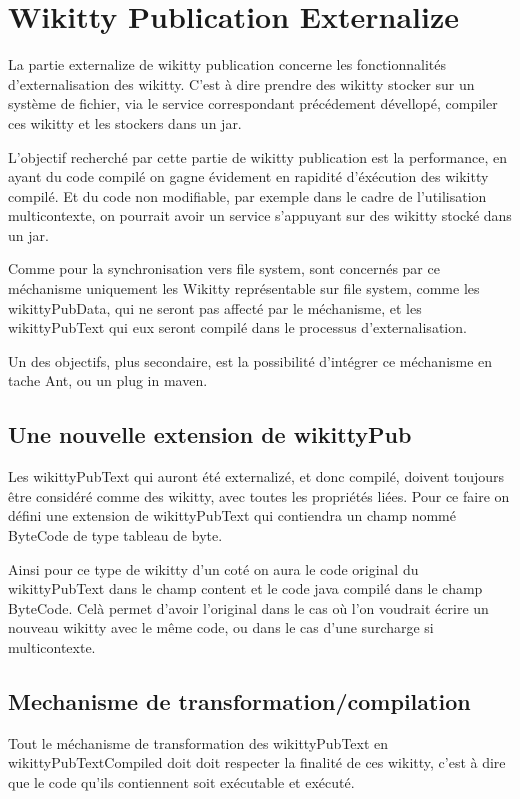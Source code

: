 \section{Wikitty Publication Externalize}

La partie externalize de wikitty publication concerne les fonctionnalités 
d'externalisation des wikitty. C'est à dire prendre des wikitty stocker sur un 
système de fichier, via le service correspondant précédement dévellopé, compiler
ces wikitty et les stockers dans un jar.

L'objectif recherché par cette partie de wikitty publication est la performance,
en ayant du code compilé on gagne évidement en rapidité d'éxécution des wikitty
compilé. Et du code non modifiable, par exemple dans le cadre de l'utilisation 
multicontexte, on pourrait avoir un service s'appuyant sur des wikitty stocké 
dans un jar.

Comme pour la synchronisation vers file system, sont concernés par ce méchanisme
uniquement les Wikitty représentable sur file system, comme les wikittyPubData,
qui ne seront pas affecté par le méchanisme, et les wikittyPubText qui eux seront
compilé dans le processus d'externalisation.

Un des objectifs, plus secondaire, est la possibilité d'intégrer ce méchanisme
en tache Ant, ou un plug in maven.

\subsection{Une nouvelle extension de wikittyPub}

Les wikittyPubText qui auront été externalizé, et donc compilé, doivent toujours 
être considéré comme des wikitty, avec toutes les propriétés liées. Pour ce 
faire on défini une extension de wikittyPubText qui contiendra un champ nommé 
ByteCode de type tableau de byte.

Ainsi pour ce type de wikitty d'un coté on aura le code original du 
wikittyPubText dans le champ content et le code java compilé dans le champ
ByteCode. Celà permet d'avoir l'original dans le cas où l'on voudrait écrire
un nouveau wikitty avec le même code, ou dans le cas d'une surcharge si 
multicontexte.

\subsection{Mechanisme de transformation/compilation}

Tout le méchanisme de transformation des wikittyPubText en wikittyPubTextCompiled
doit doit respecter la finalité de ces wikitty, c'est à dire que le code qu'ils
contiennent soit exécutable et exécuté. 

